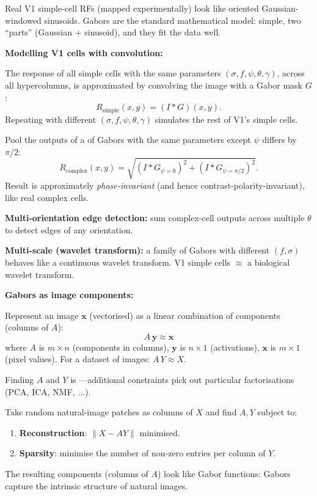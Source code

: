 \begin{tipbox}
Real V1 simple-cell RFs (mapped experimentally) look like oriented Gaussian-windowed sinusoids. Gabors are the standard mathematical model: simple, two ``parts'' (Gaussian + sinusoid), and they fit the data well.
\end{tipbox}

\separator

\textbf{Modelling V1 cells with convolution:}

\begin{thmbox}
The response of all simple cells with the same parameters $(\sigma, f, \psi, \theta, \gamma)$, across all hypercolumns, is approximated by convolving the image with a Gabor mask $G$:
\[
R_{\text{simple}}(x,y) = (I * G)(x,y).
\]
Repeating with different $(\sigma, f, \psi, \theta, \gamma)$ simulates the rest of V1's simple cells.
\end{thmbox}

\begin{thmbox}
Pool the outputs of a  of Gabors with the same parameters except $\psi$ differs by $\pi/2$:
\[
R_{\text{complex}}(x,y) = \sqrt{(I * G_{\psi=0})^2 + (I * G_{\psi=\pi/2})^2}.
\]
Result is approximately \emph{phase-invariant} (and hence contrast-polarity-invariant), like real complex cells.
\end{thmbox}

\textbf{Multi-orientation edge detection:} sum complex-cell outputs across multiple $\theta$ to detect edges of any orientation.

\textbf{Multi-scale (wavelet transform):} a family of Gabors with different $(f, \sigma)$ behaves like a continuous wavelet transform. V1 simple cells $\approx$ a biological wavelet transform.

\separator

\textbf{Gabors as image components:}

Represent an image $\mathbf{x}$ (vectorised) as a linear combination of components (columns of $A$):
\[
A\,\mathbf{y} \approx \mathbf{x}
\]
where $A$ is $m\times n$ (components in columns), $\mathbf{y}$ is $n\times 1$ (activations), $\mathbf{x}$ is $m\times 1$ (pixel values). For a dataset of images: $A\,Y \approx X$.

Finding $A$ and $Y$ is ---additional constraints pick out particular factorisations (PCA, ICA, NMF, $\ldots$).

\begin{thmbox}
Take random natural-image patches as columns of $X$ and find $A,Y$ subject to:
\begin{enumerate}
  \item \textbf{Reconstruction}: $\|X - AY\|$ minimised.
  \item \textbf{Sparsity}: minimise the number of non-zero entries per column of $Y$.
\end{enumerate}
The resulting components (columns of $A$) look like Gabor functions: Gabors capture the intrinsic structure of natural images.
\end{thmbox}

